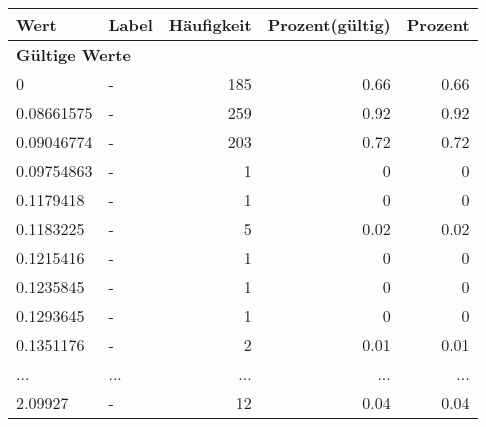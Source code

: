     \begin{longtable}{lXrrr}
     \toprule
     \textbf{Wert} & \textbf{Label} & \textbf{Häufigkeit} & \textbf{Prozent(gültig)} & \textbf{Prozent} \\
     \endhead
     \midrule
     \multicolumn{5}{l}{\textbf{Gültige Werte}}\\
        0 & \multicolumn{1}{X}{-} & %
          \num{185} &
          \num[round-mode=places,round-precision=2]{0,66} &
          \num[round-mode=places,round-precision=2]{0,66} \\
        0.08661575 & \multicolumn{1}{X}{-} & %
          \num{259} &
          \num[round-mode=places,round-precision=2]{0,92} &
          \num[round-mode=places,round-precision=2]{0,92} \\
        0.09046774 & \multicolumn{1}{X}{-} & %
          \num{203} &
          \num[round-mode=places,round-precision=2]{0,72} &
          \num[round-mode=places,round-precision=2]{0,72} \\
        0.09754863 & \multicolumn{1}{X}{-} & %
          \num{1} &
          \num[round-mode=places,round-precision=2]{0} &
          \num[round-mode=places,round-precision=2]{0} \\
        0.1179418 & \multicolumn{1}{X}{-} & %
          \num{1} &
          \num[round-mode=places,round-precision=2]{0} &
          \num[round-mode=places,round-precision=2]{0} \\
        0.1183225 & \multicolumn{1}{X}{-} & %
          \num{5} &
          \num[round-mode=places,round-precision=2]{0,02} &
          \num[round-mode=places,round-precision=2]{0,02} \\
        0.1215416 & \multicolumn{1}{X}{-} & %
          \num{1} &
          \num[round-mode=places,round-precision=2]{0} &
          \num[round-mode=places,round-precision=2]{0} \\
        0.1235845 & \multicolumn{1}{X}{-} & %
          \num{1} &
          \num[round-mode=places,round-precision=2]{0} &
          \num[round-mode=places,round-precision=2]{0} \\
        0.1293645 & \multicolumn{1}{X}{-} & %
          \num{1} &
          \num[round-mode=places,round-precision=2]{0} &
          \num[round-mode=places,round-precision=2]{0} \\
        0.1351176 & \multicolumn{1}{X}{-} & %
          \num{2} &
          \num[round-mode=places,round-precision=2]{0,01} &
          \num[round-mode=places,round-precision=2]{0,01} \\
       ... & ... & ... & ... & ... \\
        2.09927 & \multicolumn{1}{X}{-} & %
          \num{12} &
          \num[round-mode=places,round-precision=2]{0,04} &
          \num[round-mode=places,round-precision=2]{0,04} \\


\end{longtable}
